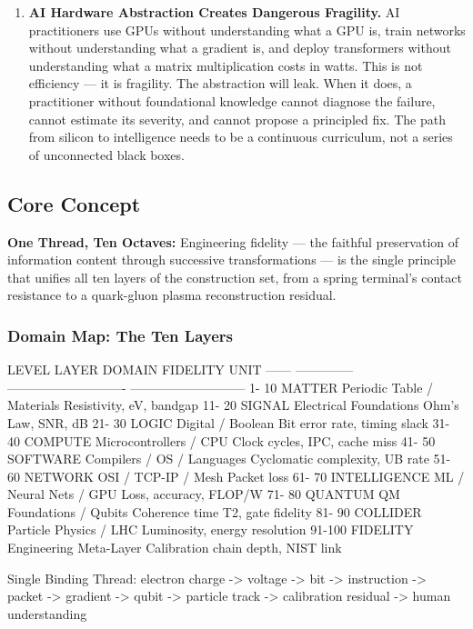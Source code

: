 \documentclass[11pt,letterpaper]{article}
\begin{document}
\begin{enumerate}[leftmargin=*, label=\textbf{P\arabic*.}]
\item \textbf{AI Hardware Abstraction Creates Dangerous Fragility.} AI practitioners use GPUs
without understanding what a GPU is, train networks without understanding what a gradient is,
and deploy transformers without understanding what a matrix multiplication costs in watts. This
is not efficiency --- it is fragility. The abstraction will leak. When it does, a practitioner
without foundational knowledge cannot diagnose the failure, cannot estimate its severity, and
cannot propose a principled fix. The path from silicon to intelligence needs to be a continuous
curriculum, not a series of unconnected black boxes.

\end{enumerate}

\subsection{Core Concept}

\textbf{One Thread, Ten Octaves:} Engineering fidelity --- the faithful preservation of information
content through successive transformations --- is the single principle that unifies all ten layers
of the construction set, from a spring terminal's contact resistance to a quark-gluon plasma
reconstruction residual.

\subsubsection{Domain Map: The Ten Layers}

\begin{asciibox}
LEVEL   LAYER           DOMAIN                         FIDELITY UNIT
------  --------------  ----------------------------   ---------------------------
 1- 10  MATTER          Periodic Table / Materials     Resistivity, eV, bandgap
11- 20  SIGNAL          Electrical Foundations         Ohm's Law, SNR, dB
21- 30  LOGIC           Digital / Boolean              Bit error rate, timing slack
31- 40  COMPUTE         Microcontrollers / CPU         Clock cycles, IPC, cache miss
41- 50  SOFTWARE        Compilers / OS / Languages     Cyclomatic complexity, UB rate
51- 60  NETWORK         OSI / TCP-IP / Mesh            Packet loss %
61- 70  INTELLIGENCE    ML / Neural Nets / GPU         Loss, accuracy, FLOP/W
71- 80  QUANTUM         QM Foundations / Qubits        Coherence time T2, gate fidelity
81- 90  COLLIDER        Particle Physics / LHC         Luminosity, energy resolution
91-100  FIDELITY        Engineering Meta-Layer         Calibration chain depth, NIST link

Single Binding Thread:
  electron charge -> voltage -> bit -> instruction -> packet ->
  gradient -> qubit -> particle track -> calibration residual ->
  human understanding
\end{asciibox}
\end{document}
